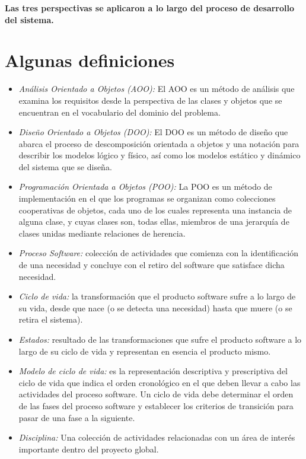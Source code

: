 \textbf{Las tres perspectivas se aplicaron a lo largo del proceso de desarrollo del sistema.}

\section{Algunas definiciones}
\begin{itemize}
    \item \emph{Análisis Orientado a Objetos (AOO):} El AOO es un método de análisis que examina los requisitos desde la perspectiva de las clases y objetos que se encuentran en el vocabulario del dominio del problema.
 
    \item \emph{Diseño Orientado a Objetos (DOO):} El DOO es un método de diseño que abarca el proceso de descomposición orientada a objetos y una notación para describir los modelos lógico y físico, así como los modelos estático y dinámico del sistema que se diseña.

    \item \emph{Programación Orientada a Objetos (POO):} La POO es un método de implementación en el que los programas se organizan como colecciones cooperativas de objetos, cada uno de los cuales representa una instancia de alguna clase, y cuyas clases son, todas ellas, miembros de una jerarquía de clases unidas mediante relaciones de herencia.

    \item \emph{Proceso Software:} colección de actividades que comienza con la identificación de una necesidad y concluye con el retiro del software que satisface dicha necesidad.

    \item \emph{Ciclo de vida:} la transformación que el producto software sufre a lo largo de su vida, desde que nace (o se detecta una necesidad) hasta que muere (o se retira el sistema).

    \item \emph{Estados:} resultado de las transformaciones que sufre el producto software a lo largo de su ciclo de vida y representan en esencia el producto mismo.

    \item \emph{Modelo de ciclo de vida:} es la representación descriptiva y prescriptiva del ciclo de vida que indica el orden cronológico en el que deben llevar a cabo las actividades del proceso software. Un ciclo de vida debe determinar el orden de las fases del proceso software y establecer los criterios de transición para pasar de una fase a la siguiente.
 
    \item \emph{Disciplina:} Una colección de actividades relacionadas con un área de interés importante dentro del proyecto global.
    
\end{itemize}

